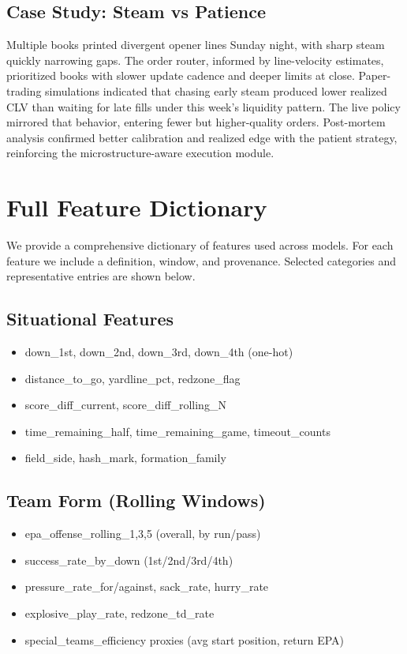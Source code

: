 \documentclass[12pt]{report}  %
\numberwithin{equation}{section}
\theoremstyle{plain}
\theoremstyle{definition}
\theoremstyle{remark}
\begin{document}
\section{Case Study: Steam vs Patience}
Multiple books printed divergent opener lines Sunday night, with sharp steam quickly narrowing gaps. The order router, informed by line-velocity estimates, prioritized books with slower update cadence and deeper limits at close. Paper-trading simulations indicated that chasing early steam produced lower realized CLV than waiting for late fills under this week’s liquidity pattern. The live policy mirrored that behavior, entering fewer but higher-quality orders. Post-mortem analysis confirmed better calibration and realized edge with the patient strategy, reinforcing the microstructure-aware execution module.

\chapter{Full Feature Dictionary}
We provide a comprehensive dictionary of features used across models. For each feature we include a definition, window, and provenance. Selected categories and representative entries are shown below.

\section{Situational Features}
\begin{itemize}
  \item down\_1st, down\_2nd, down\_3rd, down\_4th (one-hot)
  \item distance\_to\_go, yardline\_pct, redzone\_flag
  \item score\_diff\_current, score\_diff\_rolling\_N
  \item time\_remaining\_half, time\_remaining\_game, timeout\_counts
  \item field\_side, hash\_mark, formation\_family
\end{itemize}

\section{Team Form (Rolling Windows)}
\begin{itemize}
  \item epa\_offense\_rolling\_{1,3,5} (overall, by run/pass)
  \item success\_rate\_by\_down (1st/2nd/3rd/4th)
  \item pressure\_rate\_for/against, sack\_rate, hurry\_rate
  \item explosive\_play\_rate, redzone\_td\_rate
  \item special\_teams\_efficiency proxies (avg start position, return EPA)
\end{itemize}
\end{document}
